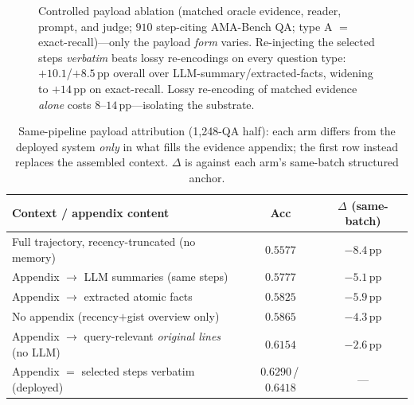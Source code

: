 \documentclass{article} %
\newcommand{\pp}{\,\mathrm{pp}}
\begin{document}
\begin{figure}[t]
\centering
{}
\caption{Controlled payload ablation (matched oracle evidence, reader, prompt, and judge;
$910$ step-citing AMA-Bench QA; type A $=$ exact-recall)---only the payload \emph{form}
varies. Re-injecting the selected steps \emph{verbatim} beats lossy re-encodings on every
question type: $+10.1$/$+8.5\pp$ overall over LLM-summary/extracted-facts, widening to
$+14\pp$ on exact-recall.
Lossy re-encoding of matched evidence \emph{alone} costs $8$--$14\pp$---isolating the substrate.}
\label{fig:payload}
\end{figure}

\begin{table}[t]
\centering
\caption{Same-pipeline payload attribution (1{,}248-QA half): each arm differs from
the deployed system \emph{only} in what fills the evidence appendix; the first row
instead replaces the assembled context. $\Delta$ is against each arm's same-batch
structured anchor.}
\label{tab:family}
\small
\setlength{\tabcolsep}{4pt}
\begin{tabular}{lcc}
\toprule
Context / appendix content & Acc & $\Delta$ (same-batch) \\
\midrule
Full trajectory, recency-truncated (no memory) & $0.5577$ & $-8.4\pp$ \\
Appendix $\to$ LLM summaries (same steps) & $0.5777$ & $-5.1\pp$ \\
Appendix $\to$ extracted atomic facts & $0.5825$ & $-5.9\pp$ \\
No appendix (recency$+$gist overview only) & $0.5865$ & $-4.3\pp$ \\
Appendix $\to$ query-relevant \emph{original lines} (no LLM) & $0.6154$ & $-2.6\pp$ \\
Appendix $=$ selected steps verbatim (deployed) & $0.6290$\,/\,$0.6418$ & --- \\
\bottomrule
\end{tabular}
\end{table}
\end{document}
